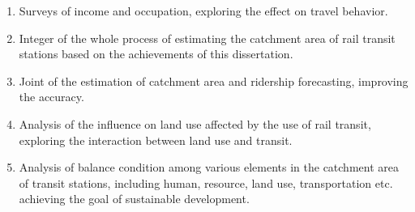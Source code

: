 \begin{enumerate}
	\item Surveys of income and occupation, exploring the effect on travel behavior.
	
	\item Integer of the whole process of estimating the catchment area of rail transit stations based on the achievements of this dissertation.
	
	\item Joint of the estimation of catchment area and ridership forecasting, improving the accuracy.
	
	\item Analysis of the influence on land use affected by the use of rail transit, exploring the interaction between land use and transit.
	
	\item Analysis of balance condition among various elements in the catchment area of transit stations, including human, resource, land use, transportation etc. achieving the goal of sustainable development.
\end{enumerate}

\clearpage %

% 
% 